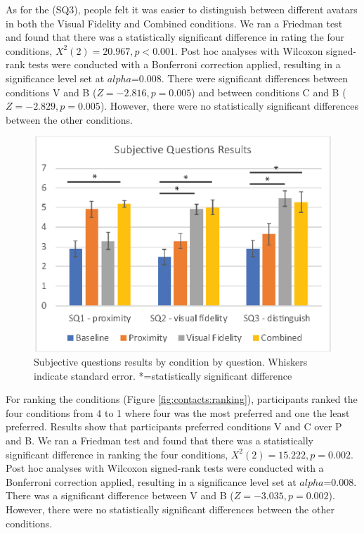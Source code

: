 As for the (SQ3), people felt it was easier to distinguish between different avatars in both the Visual Fidelity and Combined conditions. We ran a Friedman test and found that there was a statistically significant difference in rating the four conditions, $X^2(2)=20.967,p<0.001$. Post hoc analyses with Wilcoxon signed-rank tests were conducted with a Bonferroni correction applied, resulting in a significance level set at $alpha$=0.008. There were significant differences between conditions V and B  ($Z=-2.816, p=0.005$) and between conditions C and B ($Z=-2.829, p=0.005$). However, there were no statistically significant differences between the other conditions.


\begin{figure}[ht]
    \centering
    \includegraphics[width=.8\linewidth]{images/mgia17/analysis-images-05.eps}
    \caption{Subjective questions results by condition by question. Whiskers indicate standard error. *=statistically significant difference}
    \label{fig:contacts:sq2}
\end{figure}

For ranking the conditions (Figure \ref{fig:contacts:ranking}), participants ranked the four conditions from 4 to 1 where four was the most preferred and one the least preferred. Results show that participants preferred conditions V and C over P and B. We ran a Friedman test and found that there was a statistically significant difference in ranking the four conditions, $X^2(2)=15.222,p=0.002$. Post hoc analyses with Wilcoxon signed-rank tests were conducted with a Bonferroni correction applied, resulting in a significance level set at $alpha$=0.008. There was a significant difference between V and B  ($Z=-3.035, p=0.002$). However, there were no statistically significant differences between the other conditions.

